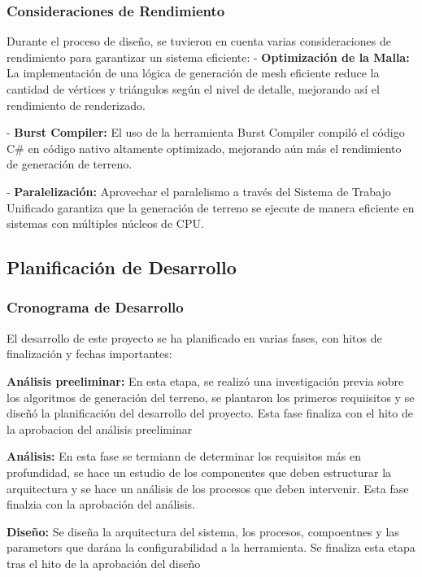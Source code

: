 \subsubsection{Consideraciones de Rendimiento}
Durante el proceso de diseño, se tuvieron en cuenta varias consideraciones de rendimiento para garantizar un sistema eficiente: 
- \textbf{Optimización de la Malla:} La implementación de una lógica de generación de mesh eficiente reduce la cantidad de vértices y triángulos según el nivel de detalle, mejorando así el rendimiento de renderizado.

- \textbf{Burst Compiler:} El uso de la herramienta Burst Compiler compiló el código C\# en código nativo altamente optimizado, mejorando aún más el rendimiento de generación de terreno.

- \textbf{Paralelización:} Aprovechar el paralelismo a través del Sistema de Trabajo Unificado garantiza que la generación de terreno se ejecute de manera eficiente en sistemas con múltiples núcleos de CPU.

\subsection{Planificación de Desarrollo}

\subsubsection{Cronograma de Desarrollo}

El desarrollo de este proyecto se ha planificado en varias fases, con hitos de finalización y fechas importantes:

 \textbf{Análisis preeliminar:} En esta etapa, se realizó una investigación previa sobre los algoritmos de generación del terreno, se plantaron los primeros requiisitos y se diseñó la planificación del desarrollo del proyecto. Esta fase finaliza con el hito de la aprobacion del análisis preeliminar

 \textbf{Análisis:} En esta fase se termiann de determinar los requisitos más en profundidad, se hace un estudio de los componentes que deben estructurar la arquitectura y se hace un análisis de los procesos que deben intervenir. Esta fase finalzia con la aprobación del análisis.

 \textbf{Diseño:} Se diseña la arquitectura del sistema, los procesos, compoentnes y las parametors que darána la configurabilidad a la herramienta. Se finaliza esta etapa tras el hito de la aprobación del diseño

